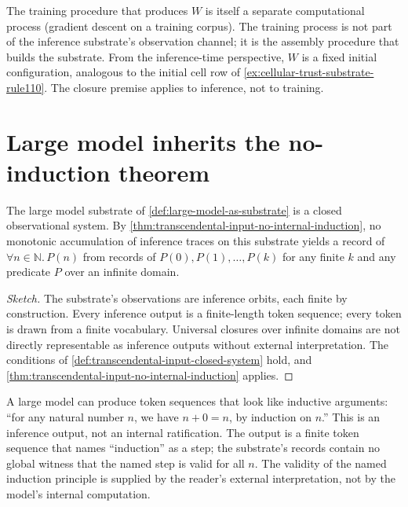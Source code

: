 \begin{remark}
\label{rem:large-model-training-vs-observation}
The training procedure that produces $W$ is itself a separate computational process (gradient descent on a training corpus). The training process is not part of the inference substrate's observation channel; it is the assembly procedure that builds the substrate. From the inference-time perspective, $W$ is a fixed initial configuration, analogous to the initial cell row of \autoref{ex:cellular-trust-substrate-rule110}. The closure premise applies to inference, not to training.
\end{remark}

\section{Large model inherits the no-induction theorem}
\label{sec:large-model-inherits-no-induction}

\begin{theorem}
\label{thm:large-model-no-internal-induction}
The large model substrate of \autoref{def:large-model-as-substrate} is a closed observational system. By \autoref{thm:transcendental-input-no-internal-induction}, no monotonic accumulation of inference traces on this substrate yields a record of $\forall n \in \mathbb{N}.\, P(n)$ from records of $P(0), P(1), \ldots, P(k)$ for any finite $k$ and any predicate $P$ over an infinite domain.
\end{theorem}

\begin{proof}[Sketch]
The substrate's observations are inference orbits, each finite by construction. Every inference output is a finite-length token sequence; every token is drawn from a finite vocabulary. Universal closures over infinite domains are not directly representable as inference outputs without external interpretation. The conditions of \autoref{def:transcendental-input-closed-system} hold, and \autoref{thm:transcendental-input-no-internal-induction} applies.
\end{proof}

\begin{remark}
\label{rem:large-model-appearance-of-induction}
A large model can produce token sequences that look like inductive arguments: ``for any natural number $n$, we have $n + 0 = n$, by induction on $n$.'' This is an inference output, not an internal ratification. The output is a finite token sequence that names ``induction'' as a step; the substrate's records contain no global witness that the named step is valid for all $n$. The validity of the named induction principle is supplied by the reader's external interpretation, not by the model's internal computation.
\end{remark}

